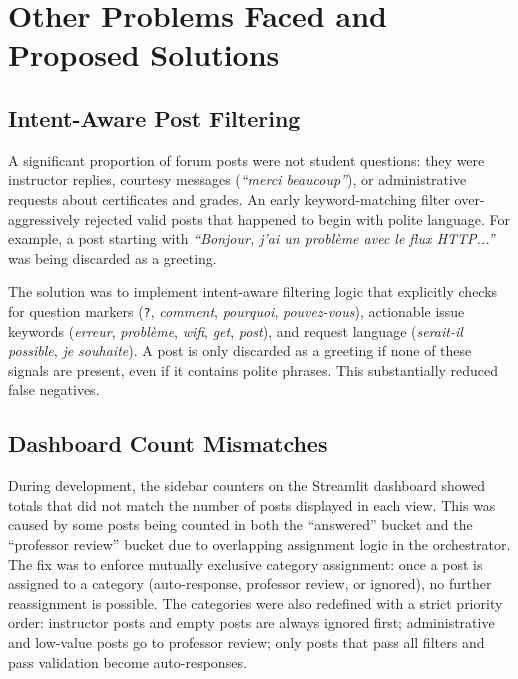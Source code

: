 \documentclass[12pt, a4paper]{article}
\begin{document}
\section{Other Problems Faced and Proposed Solutions}

\subsection{Intent-Aware Post Filtering}

A significant proportion of forum posts were not student questions: they were instructor replies, courtesy messages (\textit{``merci beaucoup''}), or administrative requests about certificates and grades. An early keyword-matching filter over-aggressively rejected valid posts that happened to begin with polite language. For example, a post starting with \textit{``Bonjour, j'ai un problème avec le flux HTTP...''} was being discarded as a greeting.

The solution was to implement intent-aware filtering logic that explicitly checks for question markers (\texttt{?}, \textit{comment}, \textit{pourquoi}, \textit{pouvez-vous}), actionable issue keywords (\textit{erreur}, \textit{problème}, \textit{wifi}, \textit{get}, \textit{post}), and request language (\textit{serait-il possible}, \textit{je souhaite}). A post is only discarded as a greeting if none of these signals are present, even if it contains polite phrases. This substantially reduced false negatives.

\subsection{Dashboard Count Mismatches}

During development, the sidebar counters on the Streamlit dashboard showed totals that did not match the number of posts displayed in each view. This was caused by some posts being counted in both the ``answered'' bucket and the ``professor review'' bucket due to overlapping assignment logic in the orchestrator. The fix was to enforce mutually exclusive category assignment: once a post is assigned to a category (auto-response, professor review, or ignored), no further reassignment is possible. The categories were also redefined with a strict priority order: instructor posts and empty posts are always ignored first; administrative and low-value posts go to professor review; only posts that pass all filters and pass validation become auto-responses.
\end{document}
